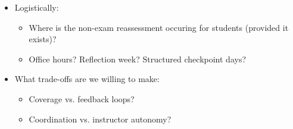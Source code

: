\documentclass[dvipsnames]{beamer}
\begin{document}
\begin{frame}
\begin{itemize}
\item Logistically: 
\begin{itemize}
    \item Where is the non-exam reassessment occuring for students (provided it exists)?
    \item Office hours? Reflection week? Structured checkpoint days?
\end{itemize}

\item What trade-offs are we willing to make:
\begin{itemize}
    \item Coverage vs. feedback loops?
    \item Coordination vs. instructor autonomy?
\end{itemize}

\end{itemize}

\end{frame}
\end{document}
